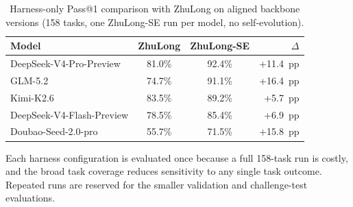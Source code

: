 \begin{table}[ht]
\caption{Harness-only Pass@1 comparison with ZhuLong on aligned backbone versions (158 tasks, one ZhuLong-SE run per model, no self-evolution). }
\label{tab:cross_method}
\setlength{\tabcolsep}{2pt}
\centering
\small
\begin{tabular}{lccr}
\toprule
Model & ZhuLong & ZhuLong-SE & $\Delta$ \\
\midrule
DeepSeek-V4-Pro-Preview   & 81.0\% & 92.4\% & +11.4~pp \\
GLM-5.2                   & 74.7\% & 91.1\% & +16.4~pp \\
Kimi-K2.6                 & 83.5\% & 89.2\% & +5.7~pp \\
DeepSeek-V4-Flash-Preview & 78.5\% & 85.4\% & +6.9~pp \\
Doubao-Seed-2.0-pro       & 55.7\% & 71.5\% & +15.8~pp \\
\bottomrule
\end{tabular}
\end{table}

Each harness configuration is evaluated once because a full 158-task run is costly, and the broad task coverage reduces sensitivity to any single task outcome. Repeated runs are reserved for the smaller validation and challenge-test evaluations.



